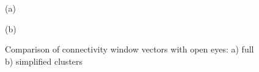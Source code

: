 \begin{figure}[h!]
\begin{minipage}[h]{0.49\linewidth}
 (a) \\
\end{minipage}
\hfill
\begin{minipage}[h]{0.5\linewidth}
 (b) \\
\end{minipage}
\caption{Comparison of connectivity window vectors with open eyes: a) full b) simplified clusters} 
\end{figure}

